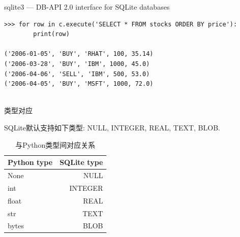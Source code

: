 \documentclass{beamer}
\begin{document}
\begin{frame}[t,fragile]{sqlite3 --- DB-API 2.0 interface for SQLite databases}

	\scriptsize

\begin{verbatim}
>>> for row in c.execute('SELECT * FROM stocks ORDER BY price'):
        print(row)

('2006-01-05', 'BUY', 'RHAT', 100, 35.14)
('2006-03-28', 'BUY', 'IBM', 1000, 45.0)
('2006-04-06', 'SELL', 'IBM', 500, 53.0)
('2006-04-05', 'BUY', 'MSFT', 1000, 72.0)


\end{verbatim}


\end{frame}

\begin{frame}[t]{类型对应}
    
SQLite默认支持如下类型: NULL, INTEGER, REAL, TEXT, BLOB.

\begin{table}
\caption{与Python类型间对应关系}
\begin{tabular}{lr}
    \hline
Python type 	&SQLite type\\
    \hline
None 	&NULL    \\
int 	&INTEGER \\
float 	&REAL    \\
str 	&TEXT    \\
bytes 	&BLOB    \\
    \hline
    
\end{tabular}
    
\end{table}

\end{frame}

\end{document}
